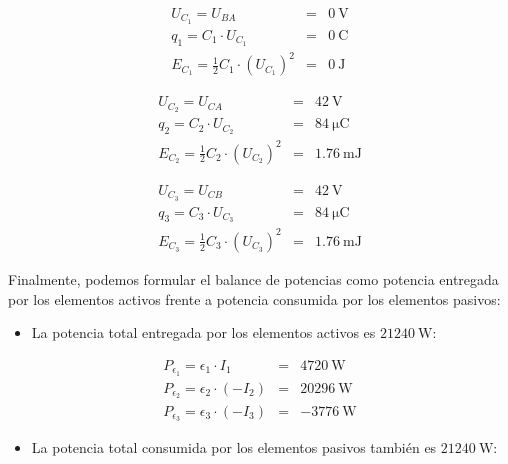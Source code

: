 \documentclass[10pt]{article}
\begin{document}
\vspace{-3mm}
\begin{eqnarray*}
    U_{C_1} = U_{BA} & = & \qty{0}{\volt}\\
    q_1 = C_1 \cdot U_{C_1} & = & \boxed{\qty{0}{\coulomb}}\\
    E_{C_1} = \frac{1}{2} C_1 \cdot (U_{C_1})^2 & = & \boxed{\qty{0}{\joule}}
\end{eqnarray*}

\vspace{-4mm}
\begin{eqnarray*}
    U_{C_2} = U_{CA} & = & \qty{42}{\volt}\\
    q_2 = C_2 \cdot U_{C_2} & = & \boxed{\qty{84}{\micro\coulomb}}\\
    E_{C_2} = \frac{1}{2} C_2 \cdot (U_{C_2})^2 & = & \boxed{\qty{1.76}{\milli\joule}}
\end{eqnarray*}

\vspace{-4mm}
\begin{eqnarray*}
    U_{C_3} = U_{CB} & = & \qty{42}{\volt}\\
    q_3 = C_3 \cdot U_{C_3} & = & \boxed{\qty{84}{\micro\coulomb}}\\
    E_{C_3} = \frac{1}{2} C_3 \cdot (U_{C_3})^2 & = & \boxed{\qty{1.76}{\milli\joule}}
\end{eqnarray*}

\vspace{5mm}
Finalmente, podemos formular el balance de potencias como potencia entregada por los elementos activos frente a potencia consumida por los elementos pasivos:

\vspace{1mm}
\begin{itemize}
    \item La potencia total entregada por los elementos activos es $\qty{21240}{\watt}$:
\end{itemize}

\vspace{-7mm}
\begin{eqnarray*}
P_{\epsilon_1} = \epsilon_1 \cdot I_1 & = & \qty{4720}{\watt}\\
P_{\epsilon_2} = \epsilon_2 \cdot (-I_2) & = & \qty{20296}{\watt}\\
P_{\epsilon_3} = \epsilon_3 \cdot (-I_3) & = & \qty{-3776}{\watt}
\end{eqnarray*}

\vspace{1mm}
\begin{itemize}
    \item La potencia total consumida por los elementos pasivos también es $\qty{21240}{\watt}$:
\end{itemize}
\end{document}
